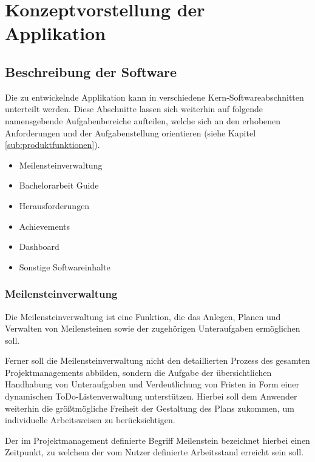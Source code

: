 \documentclass[bibliography=totoc,listof=totoc,BCOR=5mm,DIV=12,oneside]{scrbook}
\begin{document}
\newpage
\chapter{Konzeptvorstellung der Applikation} \label{chap:konzept}

\section{Beschreibung der Software}
\par Die zu entwickelnde Applikation kann in verschiedene Kern-Softwareabschnitten unterteilt werden. Diese Abschnitte lassen sich weiterhin auf folgende namensgebende Aufgabenbereiche aufteilen, welche sich an den erhobenen Anforderungen und der Aufgabenstellung orientieren (siehe Kapitel \ref{sub:produktfunktionen}).

\begin{itemize}
\item Meilensteinverwaltung
\item Bachelorarbeit Guide
\item Herausforderungen
\item Achievements
\item Dashboard
\item Sonstige Softwareinhalte
\end{itemize}

\newpage
\subsection{Meilensteinverwaltung}
\par Die Meilensteinverwaltung ist eine Funktion, die das Anlegen, Planen und Verwalten von Meilensteinen sowie der zugehörigen Unteraufgaben ermöglichen soll. 
\par Ferner soll die Meilensteinverwaltung nicht den detaillierten Prozess des gesamten Projektmanagements abbilden, sondern die Aufgabe der übersichtlichen Handhabung von Unteraufgaben und Verdeutlichung von Fristen in Form einer dynamischen ToDo-Listenverwaltung unterstützen. Hierbei soll dem Anwender weiterhin die größtmögliche Freiheit der Gestaltung des Plans zukommen, um individuelle Arbeitsweisen zu berücksichtigen. 
\par \bigskip Der im Projektmanagement definierte Begriff \grqq Meilenstein\grqq{} bezeichnet hierbei einen Zeitpunkt, zu welchem der vom Nutzer definierte Arbeitsstand erreicht sein soll.
\end{document}
